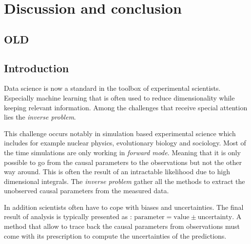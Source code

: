 
\chapter{Discussion and conclusion}
\label{chap:conclusion}
\ifpdf
    \graphicspath{{Chapter5/Figs/Raster/}{Chapter5/Figs/PDF/}{Chapter5/Figs/}}
\else
    \graphicspath{{Chapter5/Figs/Vector/}{Chapter5/Figs/}}
\fi



\section{OLD} %


\section{Introduction}


Data science is now a standard in the toolbox of experimental scientists.
Especially machine learning that is often used to reduce dimensionality while keeping relevant information.
Among the challenges that receive special attention lies the \emph{inverse problem}.

This challenge occurs notably in simulation based experimental science which includes for example nuclear physics, evolutionary biology and sociology.
Most of the time simulations are only working in \emph{forward mode}.
Meaning that it is only possible to go from the causal parameters to the observations but not the other way around.
This is often the result of an intractable likelihood due to high dimensional integrals.
The \emph{inverse problem} gather all the methods to extract the unobserved causal parameters from the measured data.

In addition scientists often have to cope with biases and uncertainties.
The final result of analysis is typically presented as : $\text{parameter} = \text{value} \pm \text{uncertainty}$.
A method that allow to trace back the causal parameters from observations must come with its prescription to compute the uncertainties of the predictions.

